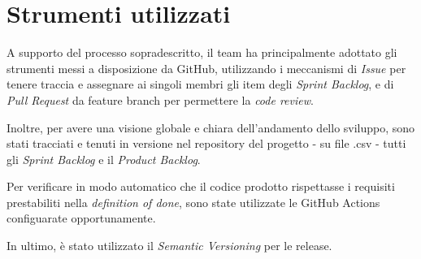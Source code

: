 \section{Strumenti utilizzati}\label{sec:strumenti-utilizzati}
A supporto del processo sopradescritto, il team ha principalmente adottato gli strumenti messi a disposizione da GitHub, utilizzando i meccanismi di \textit{Issue} per
tenere traccia e assegnare ai singoli membri gli item degli \textit{Sprint Backlog}, e di \textit{Pull Request} da feature branch per permettere la \textit{code review}.

Inoltre, per avere una visione globale e chiara dell'andamento dello sviluppo, sono stati tracciati e tenuti in versione nel repository del progetto - su file .csv - tutti gli \textit{Sprint Backlog} e il \textit{Product Backlog}.

Per verificare in modo automatico che il codice prodotto rispettasse i requisiti prestabiliti nella \textit{definition of done}, sono state utilizzate le GitHub Actions configuarate opportunamente.

In ultimo, è stato utilizzato il \textit{Semantic Versioning}  per le release.